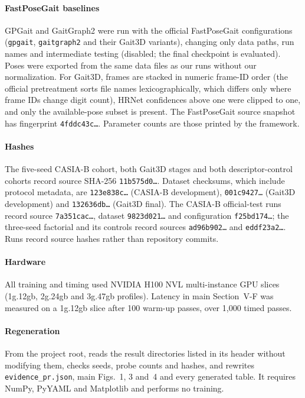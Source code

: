 \documentclass[11pt]{article}
\begin{document}
\paragraph{FastPoseGait baselines}
GPGait and GaitGraph2 were run with the official FastPoseGait configurations
(\texttt{gpgait}, \texttt{gaitgraph2} and their Gait3D variants), changing
only data paths, run names and intermediate testing (disabled; the final
checkpoint is evaluated). Poses were exported from the same data files as our
runs without our normalization. For Gait3D, frames are stacked in numeric
frame-ID order (the official pretreatment sorts file names lexicographically,
which differs only where frame IDs change digit count), HRNet confidences above
one were clipped to one, and only the available-pose subset is present. The
FastPoseGait source snapshot has fingerprint \texttt{4fddc43c\ldots}. Parameter
counts are those printed by the framework.

\paragraph{Hashes}
The five-seed CASIA-B cohort, both Gait3D stages and both descriptor-control
cohorts record source SHA-256 \texttt{11b575d0\ldots}. Dataset checksums,
which include protocol metadata, are \texttt{123e838c\ldots} (CASIA-B
development), \texttt{001c9427\ldots} (Gait3D development) and
\texttt{132636db\ldots} (Gait3D final). The CASIA-B official-test runs record
source \texttt{7a351cac\ldots}, dataset \texttt{9823d021\ldots} and
configuration \texttt{f25bd174\ldots}; the three-seed factorial and its
controls record sources \texttt{ad96b902\ldots} and \texttt{eddf23a2\ldots}.
Runs record source hashes rather than repository commits.

\paragraph{Hardware}
All training and timing used NVIDIA H100 NVL multi-instance GPU slices
(1g.12gb, 2g.24gb and 3g.47gb profiles). Latency in main Section~V-F was
measured on a 1g.12gb slice after 100 warm-up passes, over 1,000 timed passes.

\paragraph{Regeneration}
From the project root,
 reads the result directories listed in its header without modifying them,
checks seeds, probe counts and hashes, and rewrites \texttt{evidence\_pr.json},
main Figs.~1, 3 and~4 and every generated table. It requires NumPy, PyYAML and
Matplotlib and performs no training.
\end{document}
